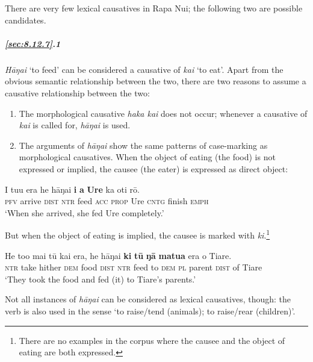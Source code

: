 There are very few lexical causatives in Rapa Nui; the following two are possible candidates.

\subparagraph{\ref{sec:8.12.7}.1} \textit{Hāŋai} ‘to feed’ can be considered a causative of \textit{kai} ‘to eat’. Apart from the obvious semantic relationship between the two, there are two reasons to assume a causative relationship between the two:

\begin{enumerate}
\item 
The morphological causative \textit{haka kai} does not occur; whenever a causative of \textit{kai} is called for, \textit{hāŋai} is used. 

\item 
The arguments of \textit{hāŋai} show the same patterns of case-marking as morphological causatives. When the object of eating (the food) is not expressed or implied, the causee (the eater) is expressed as direct object:

\end{enumerate}

\ea\label{ex:8.255}
\gll I tu{\ꞌ}u era he hāŋai \textbf{i} \textbf{a} \textbf{Ure} ka oti rō. \\
\textsc{pfv} arrive \textsc{dist} \textsc{ntr} feed \textsc{acc} \textsc{prop} Ure \textsc{cntg} finish \textsc{emph} \\

\glt
‘When she arrived, she fed Ure completely.’ \textstyleExampleref{[R310.291]} 
\z

But when the object of eating is implied, the causee is marked with \textit{ki}.\footnote{\label{fn:458}There are no examples in the corpus where the causee and the object of eating are both expressed.}

\ea\label{ex:8.256}
\gll He to{\ꞌ}o mai tū kai era, he hāŋai \textbf{ki} \textbf{tū} \textbf{ŋā} \textbf{matu{\ꞌ}a} era o Tiare. \\
\textsc{ntr} take hither \textsc{dem} food \textsc{dist} \textsc{ntr} feed to \textsc{dem} \textsc{pl} parent \textsc{dist} of Tiare \\

\glt
‘They took the food and fed (it) to Tiare’s parents.’ \textstyleExampleref{[R238.009]} 
\z

Not all instances of \textit{hāŋai} can be considered as lexical causatives, though: the verb is also used in the sense ‘to raise/tend (animals); to raise/rear (children)’.

